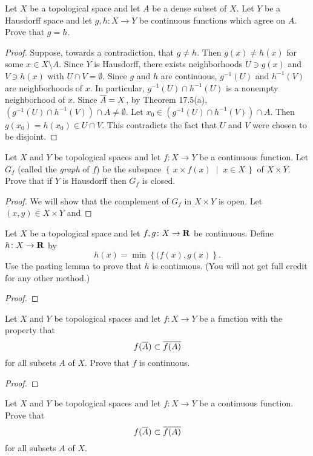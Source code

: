 \begin{problem}
Let $X$ be a topological space and let $A$ be a dense subset of
$X$. Let $Y$ be a Hausdorff space and let $g,h\colon X\to Y$ be
continuous functions which agree on $A$. Prove that $g=h$.
\end{problem}
\begin{proof}
Suppose, towards a contradiction, that $g\neq h$. Then $g(x)\neq
h(x)$ for some $x\in X\setminus A$. Since $Y$ is Hausdorff, there
exists neighborhoods $U\ni g(x)$ and $V\ni h(x)$ with $U\cap
V=\emptyset$. Since $g$ and $h$ are continuous, $g^{-1}(U)$ and
$h^{-1}(V)$ are neighborhoods of $x$. In particular,
$g^{-1}(U)\cap h^{-1}(U)$ is a nonempty neighborhood of
$x$. Since $\overline{A}=X$, by Theorem 17.5(a), $\left(g^{-1}(U)\cap
h^{-1}(V)\right)\cap A\neq\emptyset$. Let $x_0\in\left(g^{-1}(U)\cap
h^{-1}(V)\right)\cap A$. Then $g(x_0)=h(x_0)\in U\cap V$. This
contradicts the fact that $U$ and $V$ were chosen to be
disjoint.
\end{proof}
\begin{problem}
Let $X$ and $Y$ be topological spaces and let $f\colon X\to Y$
be a continuous function. Let $G_f$ (called the \emph{graph} of
$f$) be the subspace $\left\{\,x\times f(x)\;\middle|\;x\in
  X\,\right\}$ of $X\times Y$. Prove that if $Y$ is Hausdorff then
$G_f$ is closed.
\end{problem}
\begin{proof}
We will show that the complement of $G_f$ in $X\times Y$ is
open. Let $(x,y)\in X\times Y$ and
\end{proof}
\begin{problem}
Let $X$ be a topological space and let $f,g\colon X\to\mathbf{R}$ be
continuous. Define $h\colon X\to\mathbf{R}$ by
\[
h(x)=\min\left\{(f(x),g(x)\right\}.
\]
Use the pasting lemma to prove that $h$ is continuous. (You will
not get full credit for any other method.)
\end{problem}
\begin{proof}
\end{proof}
\begin{problem}
Let $X$ and $Y$ be topological spaces and let $f\colon X\to Y$ be
a function with the property that
\[
f(\overline{A})\subset\overline{f(A)}
\]
for all subsets $A$ of $X$. Prove that $f$ is continuous.
\end{problem}
\begin{proof}
\end{proof}
\begin{problem}
Let $X$ and $Y$ be topological spaces and let $f\colon X\to Y$ be
a continuous function. Prove that
\[
f(\overline{A})\subset\overline{f(A)}
\]
for all subsets $A$ of $X$.
\end{problem}
